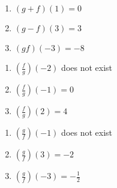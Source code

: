 \begin{multicols}{3}
\begin{enumerate}
\setcounter{enumi}{\value{HW}}

\item $(g + f)(1) = 0$
\item $(g - f)(3) = 3$
\item $(gf)(-3) = -8$

\setcounter{HW}{\value{enumi}}
\end{enumerate}
\end{multicols}

\begin{multicols}{3}
\begin{enumerate}
\setcounter{enumi}{\value{HW}}

\item $\left(\frac{f}{g}\right)(-2)$ does not exist
\item $\left(\frac{f}{g}\right)(-1) = 0$
\item $\left(\frac{f}{g}\right)(2) = 4$

\setcounter{HW}{\value{enumi}}
\end{enumerate}
\end{multicols}

\begin{multicols}{3}
\begin{enumerate}
\setcounter{enumi}{\value{HW}}

\item $\left(\frac{g}{f}\right)(-1)$ does not exist
\item $\left(\frac{g}{f}\right)(3) = -2$ 
\item $\left(\frac{g}{f}\right)(-3) = -\frac{1}{2}$ 

\setcounter{HW}{\value{enumi}}
\end{enumerate}
\end{multicols}

\newpage

